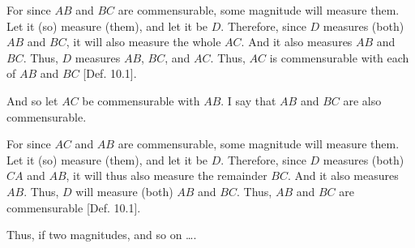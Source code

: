 \begin{Parallel}{}{}
{For since $AB$ and $BC$ are commensurable, some  magnitude will
measure them. Let it (so) measure (them), and let it be $D$. Therefore,
since $D$ measures (both) $AB$ and $BC$, it will also measure the
whole $AC$. And it also measures $AB$ and $BC$. Thus, $D$
measures  $AB$, $BC$, and $AC$. Thus, $AC$ is commensurable
with each of $AB$ and $BC$ [Def. 10.1].

And so let $AC$ be commensurable with $AB$. I say that $AB$ and
$BC$ are also commensurable.

For since $AC$ and $AB$ are commensurable, some  magnitude
will measure them. Let it (so) measure (them), and let it be $D$. Therefore,
since $D$ measures (both) $CA$ and $AB$, it will thus also
measure the remainder $BC$. And it also measures $AB$. Thus, $D$ will
measure (both) $AB$ and $BC$. Thus, $AB$ and $BC$ are commensurable [Def. 10.1].

Thus, if two magnitudes, and so on \ldots.}
\end{Parallel}

